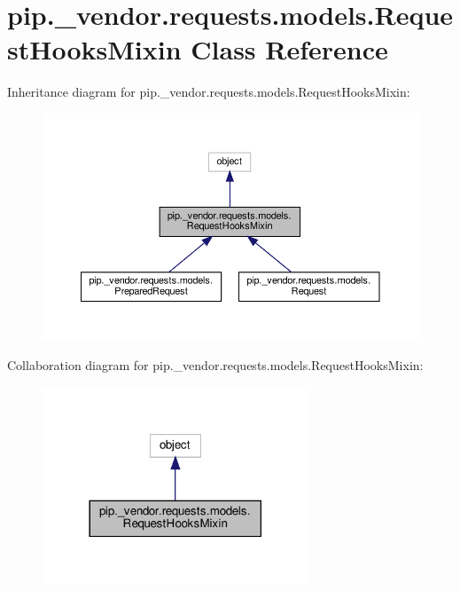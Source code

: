 \hypertarget{classpip_1_1__vendor_1_1requests_1_1models_1_1RequestHooksMixin}{}\section{pip.\+\_\+vendor.\+requests.\+models.\+Request\+Hooks\+Mixin Class Reference}
\label{classpip_1_1__vendor_1_1requests_1_1models_1_1RequestHooksMixin}


Inheritance diagram for pip.\+\_\+vendor.\+requests.\+models.\+Request\+Hooks\+Mixin\+:
\nopagebreak
\begin{figure}[H]
\begin{center}
\leavevmode
\includegraphics[width=350pt]{classpip_1_1__vendor_1_1requests_1_1models_1_1RequestHooksMixin__inherit__graph}
\end{center}
\end{figure}


Collaboration diagram for pip.\+\_\+vendor.\+requests.\+models.\+Request\+Hooks\+Mixin\+:
\nopagebreak
\begin{figure}[H]
\begin{center}
\leavevmode
\includegraphics[width=225pt]{classpip_1_1__vendor_1_1requests_1_1models_1_1RequestHooksMixin__coll__graph}
\end{center}
\end{figure}
